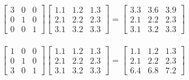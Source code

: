 \clearpage


\begin{align*}
	\begin{bmatrix*}
		3 & 0 & 0\\
		0 & 1 & 0\\
		0 & 0 & 1
	\end{bmatrix*}
	\begin{bmatrix*}
		1.1 & 1.2 & 1.3\\
		2.1 & 2.2 & 2.3\\
		3.1 & 3.2 & 3.3
	\end{bmatrix*}
	=
	\begin{bmatrix*}
		3.3 & 3.6 & 3.9\\
		2.1 & 2.2 & 2.3\\
		3.1 & 3.2 & 3.3
	\end{bmatrix*}
\end{align*}



\begin{align*}
	\begin{bmatrix*}
		1 & 0 & 0\\
		0 & 1 & 0\\
		3 & 0 & 1
	\end{bmatrix*}
	\begin{bmatrix*}
		1.1 & 1.2 & 1.3\\
		2.1 & 2.2 & 2.3\\
		3.1 & 3.2 & 3.3
	\end{bmatrix*}
	=
	\begin{bmatrix*}
		1.1 & 1.2 & 1.3\\
		2.1 & 2.2 & 2.3\\
		6.4 & 6.8 & 7.2
	\end{bmatrix*}
\end{align*}










